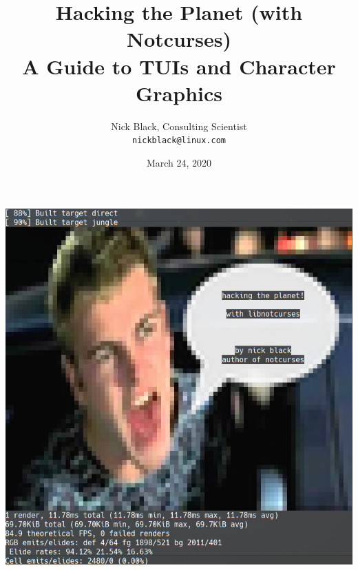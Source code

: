 \documentclass[letterpaper,10pt]{article}
\title{Hacking the Planet (with Notcurses)\\
A Guide to TUIs and Character Graphics
}
\author{Nick Black, Consulting Scientist\\
\texttt{nickblack@linux.com}
}
\begin{document}
%
\date{March 24, 2020}
\maketitle
\date{}
\vspace{1in}
\begin{center}
\includegraphics[width=.75\linewidth]{htp-with-notcurses.png}
\end{center}
\thispagestyle{empty}

\clearpage
{}
\end{document}
